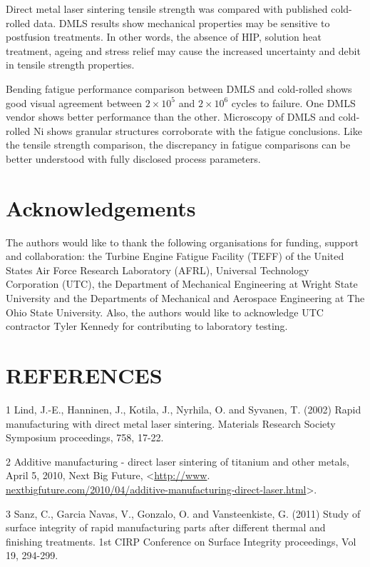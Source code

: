 \documentclass[10pt]{article}
\begin{document}
Direct metal laser sintering tensile strength was compared with published cold-rolled data. DMLS results show mechanical properties may be sensitive to postfusion treatments. In other words, the absence of HIP, solution heat treatment, ageing and stress relief may cause the increased uncertainty and debit in tensile strength properties.

Bending fatigue performance comparison between DMLS and cold-rolled shows good visual agreement between $2 \times 10^{5}$ and $2 \times 10^{6}$ cycles to failure. One DMLS vendor shows better performance than the other. Microscopy of DMLS and cold-rolled Ni shows granular structures corroborate with the fatigue conclusions. Like the tensile strength comparison, the discrepancy in fatigue comparisons can be better understood with fully disclosed process parameters.

\section*{Acknowledgements}
The authors would like to thank the following organisations for funding, support and collaboration: the Turbine Engine Fatigue Facility (TEFF) of the United States Air Force Research Laboratory (AFRL), Universal Technology Corporation (UTC), the Department of Mechanical Engineering at Wright State University and the Departments of Mechanical and Aerospace Engineering at The Ohio State University. Also, the authors would like to acknowledge UTC contractor Tyler Kennedy for contributing to laboratory testing.

\section*{REFERENCES}
1 Lind, J.-E., Hanninen, J., Kotila, J., Nyrhila, O. and Syvanen, T. (2002) Rapid manufacturing with direct metal laser sintering. Materials Research Society Symposium proceedings, 758, 17-22.

2 Additive manufacturing - direct laser sintering of titanium and other metals, April 5, 2010, Next Big Future, <\href{http://www}{http://www}. \href{http://nextbigfuture.com/2010/04/additive-manufacturing-direct-laser.html}{nextbigfuture.com/2010/04/additive-manufacturing-direct-laser.html}>.

3 Sanz, C., Garcia Navas, V., Gonzalo, O. and Vansteenkiste, G. (2011) Study of surface integrity of rapid manufacturing parts after different thermal and finishing treatments. 1st CIRP Conference on Surface Integrity proceedings, Vol 19, 294-299.
\end{document}
